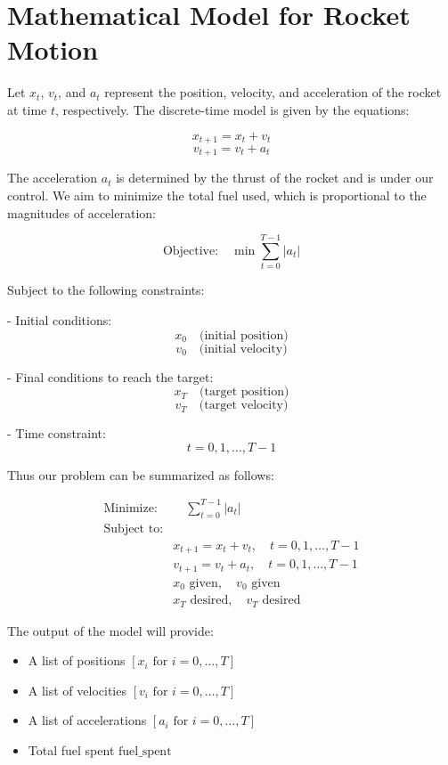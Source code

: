 \documentclass{article}
\begin{document}
\section*{Mathematical Model for Rocket Motion}

Let \( x_t \), \( v_t \), and \( a_t \) represent the position, velocity, and acceleration of the rocket at time \( t \), respectively. The discrete-time model is given by the equations:

\[
x_{t+1} = x_t + v_t
\]
\[
v_{t+1} = v_t + a_t
\]

The acceleration \( a_t \) is determined by the thrust of the rocket and is under our control. We aim to minimize the total fuel used, which is proportional to the magnitudes of acceleration:

\[
\text{Objective:} \quad \min \sum_{t=0}^{T-1} |a_t|
\]

Subject to the following constraints:

- Initial conditions:
  \[
  x_0 \quad \text{(initial position)}
  \]
  \[
  v_0 \quad \text{(initial velocity)}
  \]

- Final conditions to reach the target:
  \[
  x_T \quad \text{(target position)}
  \]
  \[
  v_T \quad \text{(target velocity)}
  \]

- Time constraint:
  \[
  t = 0, 1, \ldots, T-1
  \]

Thus our problem can be summarized as follows:

\begin{align*}
\text{Minimize:} & \quad \sum_{t=0}^{T-1} |a_t| \\
\text{Subject to:} & \\
& x_{t+1} = x_t + v_t, \quad t = 0, 1, \ldots, T-1 \\
& v_{t+1} = v_t + a_t, \quad t = 0, 1, \ldots, T-1 \\
& x_0 \text{ given}, \quad v_0 \text{ given} \\
& x_T \text{ desired}, \quad v_T \text{ desired}
\end{align*}

The output of the model will provide:
\begin{itemize}
    \item A list of positions \( [x_i \text{ for } i = 0, \ldots, T] \)
    \item A list of velocities \( [v_i \text{ for } i = 0, \ldots, T] \)
    \item A list of accelerations \( [a_i \text{ for } i = 0, \ldots, T] \)
    \item Total fuel spent \( \text{fuel\_spent} \)
\end{itemize}
\end{document}
